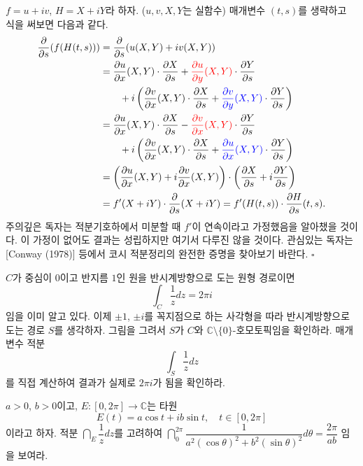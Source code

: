 $f=u+iv$, $H=X+iY$라 하자. ($u,v,X,Y$는 실함수)
매개변수 $(t,s)$를 생략하고 식을 써보면 다음과 같다.
\begin{align*}
\dfrac\partial{\partial s}(f(H(t,s)))
&= \dfrac\partial{\partial s}(u(X,Y) + iv(X,Y)) \\
&= \dfrac{\partial u}{\partial x}(X,Y)\cdot \dfrac{\partial X}{\partial s}
+ \textcolor{red}{\dfrac{\partial u}{\partial y}(X,Y)}\cdot \dfrac{\partial Y}{\partial s} \\
&\quad\quad + i \left(
\dfrac{\partial v}{\partial x}(X,Y)\cdot \dfrac{\partial X}{\partial s}
+ \textcolor{blue}{\dfrac{\partial v}{\partial y}(X,Y)}\cdot \dfrac{\partial Y}{\partial s}
\right) \\
&= \dfrac{\partial u}{\partial x}(X,Y)\cdot \dfrac{\partial X}{\partial s}
- \textcolor{red}{\dfrac{\partial v}{\partial x}(X,Y)}\cdot \dfrac{\partial Y}{\partial s} \\
&\quad\quad + i \left(
\dfrac{\partial v}{\partial x}(X,Y)\cdot \dfrac{\partial X}{\partial s}
+ \textcolor{blue}{\dfrac{\partial u}{\partial x}(X,Y)}\cdot \dfrac{\partial Y}{\partial s}
\right) \\
&= \left( \dfrac{\partial u}{\partial x}(X,Y) + i \dfrac{\partial v}{\partial x}(X,Y) \right)
\cdot \left( \dfrac{\partial X}{\partial s} + i\dfrac{\partial Y}{\partial s} \right) \\
&= f'(X+iY)\cdot \dfrac \partial{\partial s} (X+iY)
= f'(H(t,s))\cdot \dfrac{\partial H}{\partial s}(t,s).
\end{align*}
주의깊은 독자는 적분기호하에서 미분할 때 $f'$이 연속이라고 가정했음을 알아챘을 것이다.
이 가정이 없어도 결과는 성립하지만 여기서 다루진 않을 것이다.
관심있는 독자는 [Conway (1978)] 등에서   %
코시 적분정리의 완전한 증명을 찾아보기 바란다.
\hfill $\square$

\begin{salt_exercise} \label{ex-3-18}
$C$가 중심이 $0$이고 반지름 $1$인 원을 반시계방향으로 도는 원형 경로이면
\[
\int_C \dfrac 1z dz = 2\pi i
\]
임을 이미 알고 있다.
이제 $\pm 1$, $\pm i$를 꼭지점으로 하는 사각형을 따라 반시계방향으로 도는 경로 $S$를 생각하자.
그림을 그려서 $S$가 $C$와 $\mathbb C\setminus \{0\}$-호모토픽임을 확인하라.
매개변수 적분
\[
\int_S \dfrac 1z dz
\]
를 직접 계산하여 결과가 실제로 $2\pi i$가 됨을 확인하라.
\end{salt_exercise}

\begin{salt_exercise} \label{ex-3-19}
$a>0$, $b>0$이고, $E:[0,2\pi] \to \mathbb C$는 타원
\[
E(t) = a\cos t + ib\sin t, \quad t\in [0,2\pi]
\]
이라고 하자.
적분 $\dint_E \dfrac 1z dz$를 고려하여
$\dint_0^{2\pi} \dfrac 1{a^2(\cos \theta)^2 + b^2(\sin \theta)^2}d\theta = \dfrac{2\pi}{ab}$
임을 보여라.
\end{salt_exercise}

